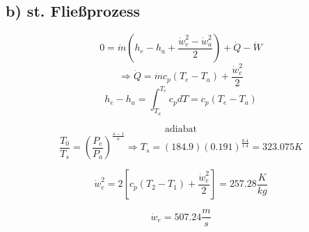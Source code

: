 \subsection*{b) st. Fließprozess}

\[
0 = \dot{m} (h_e - h_a + \frac{\dot{w}_e^2 - \dot{w}_a^2}{2}) + \dot{Q} - \dot{W}
\]
\[
\Rightarrow \dot{Q} = \dot{m} c_p (T_e - T_a) + \frac{\dot{w}_e^2}{2}
\]
\[
h_e - h_a = \int_{T_a}^{T_e} c_p dT = c_p (T_e - T_a)
\]

\[
\text{adiabat}
\]
\[
\frac{T_0}{T_s} = (\frac{P_e}{P_a})^{\frac{\kappa - 1}{\kappa}} \Rightarrow T_s = (184.9) (0.191)^{\frac{0.4}{1.4}} = 323.075 K
\]

\[
\dot{w}_e^2 = 2 \left[ c_p (T_2 - T_1) + \frac{\dot{w}_e^2}{2} \right] = 257.28 \frac{K}{kg}
\]

\[
\dot{w}_e = 507.24 \frac{m}{s}
\]